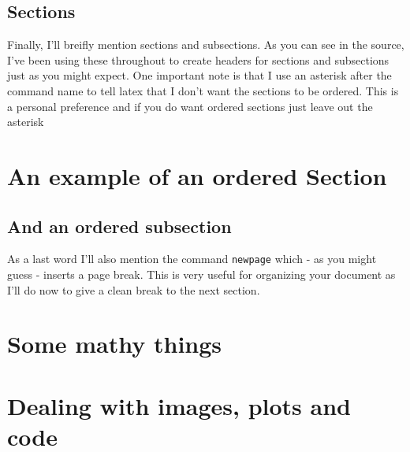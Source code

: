 \documentclass{article}
\begin{document}
\subsection*{Sections}
Finally, I'll breifly mention sections and subsections. As you can see in the
source, I've been using these throughout to create headers for sections and
subsections just as you might expect. One important note is that I use an
asterisk after the command name to tell latex that I don't want the sections
to be ordered. This is a personal preference and if you do want ordered
sections just leave out the asterisk

\section{An example of an ordered Section}
\subsection{And an ordered subsection}

As a last word I'll also mention the command \lstinline{newpage} which - as
you might guess - inserts a page break. This is very useful for organizing your
document as I'll do now to give a clean break to the next section.

\newpage
\section*{Some mathy things}
\section*{Dealing with images, plots and code}
\end{document}
